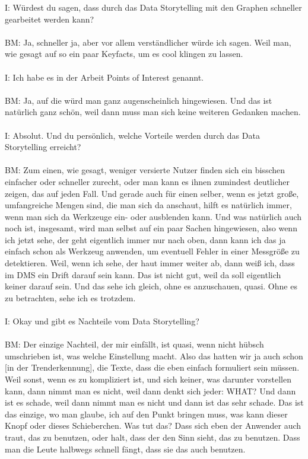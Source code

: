 \begin{linenumbers}
I: Würdest du sagen, dass durch das Data Storytelling mit den Graphen schneller gearbeitet werden kann?\\\\
BM: Ja, schneller ja, aber vor allem verständlicher würde ich sagen. Weil man, wie gesagt auf so ein paar Keyfacts, um es cool klingen zu lassen.\\\\
I: Ich habe es in der Arbeit Points of Interest genannt.\\\\
BM: Ja, auf die würd man ganz augenscheinlich hingewiesen. Und das ist natürlich ganz schön, weil dann muss man sich keine weiteren Gedanken machen. \\\\
I: Absolut. Und du persönlich, welche Vorteile werden durch das Data Storytelling erreicht?\\\\
BM: Zum einen, wie gesagt, weniger versierte Nutzer finden sich ein bisschen einfacher oder schneller zurecht, oder man kann es ihnen zumindest deutlicher zeigen, das auf jeden Fall. Und gerade auch für einen selber, wenn es jetzt große, umfangreiche Mengen sind, die man sich da anschaut, hilft es natürlich immer, wenn man sich da Werkzeuge ein- oder ausblenden kann. Und was natürlich auch noch ist, insgesamt, wird man selbst auf ein paar Sachen hingewiesen, also wenn ich jetzt sehe, der geht eigentlich immer nur nach oben, dann kann ich das ja einfach schon als Werkzeug anwenden, um eventuell Fehler in einer Messgröße zu detektieren. Weil, wenn ich sehe, der haut immer weiter ab, dann weiß ich, dass im \ac{DMS} ein Drift darauf sein kann. Das ist nicht gut, weil da soll eigentlich keiner darauf sein. Und das sehe ich gleich, ohne es anzuschauen, quasi. Ohne es zu betrachten, sehe ich es trotzdem.\\\\
I: Okay und gibt es Nachteile vom Data Storytelling?\\\\
BM: Der einzige Nachteil, der mir einfällt, ist quasi, wenn nicht hübsch umschrieben ist, was welche Einstellung macht. Also das hatten wir ja auch schon [in der Trenderkennung], die Texte, dass die eben einfach formuliert sein müssen. Weil sonst, wenn es zu kompliziert ist, und sich keiner, was darunter vorstellen kann, dann nimmt man es nicht, weil dann denkt sich jeder: WHAT? Und dann ist es schade, weil dann nimmt man es nicht und dann ist das sehr schade. Das ist das einzige, wo man glaube, ich auf den Punkt bringen muss, was kann dieser Knopf oder dieses Schieberchen. Was tut das? Dass sich eben der Anwender auch traut, das zu benutzen, oder halt, dass der den Sinn sieht, das zu benutzen. Dass man die Leute halbwegs schnell fängt, dass sie das auch benutzen.\\\\

\end{linenumbers}
